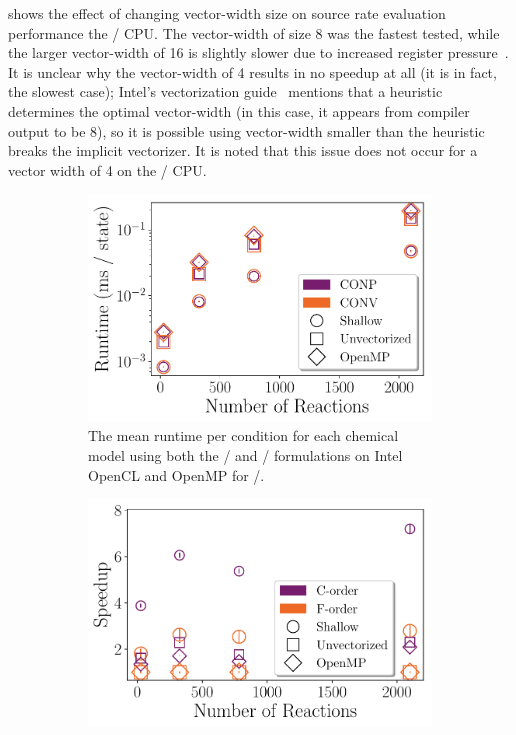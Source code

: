 \documentclass[12pt,number,sort&compress,preprint]{elsarticle}
\begin{document}
 shows the effect of changing vector-width size on source rate evaluation performance the \avx/ CPU.
The vector-width of size \num{8} was the fastest tested, while the larger vector-width of \num{16} is slightly slower due to increased register pressure~\cite{intel_vectypes}.
It is unclear why the vector-width of \num{4} results in no speedup at all (it is in fact, the slowest case); Intel's vectorization guide~\cite{intel_vecknobs} mentions that a heuristic determines the optimal vector-width (in this case, it appears from compiler output to be \num{8}), so it is possible using vector-width smaller than the heuristic breaks the implicit vectorizer.
It is noted that this issue does not occur for a vector width of \num{4} on the \sse/ CPU.

\begin{figure}[htbp]
   \centering
  \begin{subfigure}[t]{0.48\linewidth}
      \includegraphics[width=\textwidth]{source_conpvsconv.pdf}
      \caption{The mean runtime per condition for each chemical model using both the \conp/ and \conv/ formulations on Intel OpenCL and OpenMP for \avx/.}
      \label{F:source_conpvsconv}
  \end{subfigure}
  \hfill
  \begin{subfigure}[t]{0.48\linewidth}
      \includegraphics[width=\textwidth]{source_cvsf.pdf}

\end{subfigure}
\end{figure}
\end{document}
